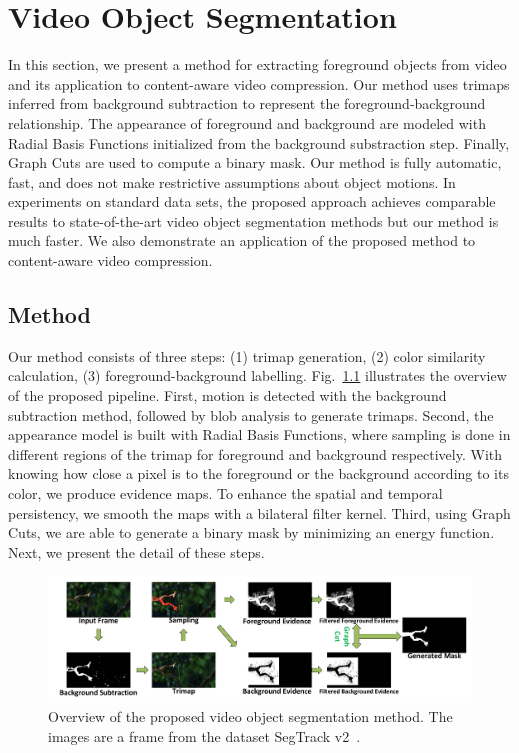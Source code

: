 \chapter{Video Object Segmentation}
\label{chap:vos}

In this section, we present a method for extracting foreground objects from video and its application to content-aware video compression. Our method uses trimaps inferred from background subtraction to represent the foreground-background relationship. The appearance of foreground and background are modeled with Radial Basis Functions initialized from the background substraction step. Finally, Graph Cuts are used to compute a binary mask. Our method is fully automatic, fast, and does not make restrictive assumptions about object motions. In experiments on standard data sets, the proposed approach achieves comparable results to state-of-the-art video object segmentation methods but our method is much faster. We also demonstrate an application of the proposed method to content-aware video compression.

\section{Method}

Our method consists of three steps: (1) trimap generation, (2) color similarity calculation, (3) foreground-background labelling. Fig.~\ref{fig-overview} illustrates the overview of the proposed pipeline. First, motion is detected with the background subtraction method, followed by blob analysis to generate trimaps. Second, the appearance model is built with Radial Basis Functions, where sampling is done in different regions of the trimap for foreground and background respectively. With knowing how close a pixel is to the foreground or the background according to its color, we produce evidence maps. To enhance the spatial and temporal persistency, we smooth the maps with a bilateral filter kernel. Third, using Graph Cuts, we are able to generate a binary mask by minimizing an energy function. Next, we present the detail of these steps.

\begin{figure}
	\centering
	\includegraphics[width=\textwidth]{figures/overview.pdf}
	\caption{Overview of the proposed video object segmentation method. The images are a frame from the dataset SegTrack v2~\cite{f-li2013}.}
	\label{fig-overview}
\end{figure}


